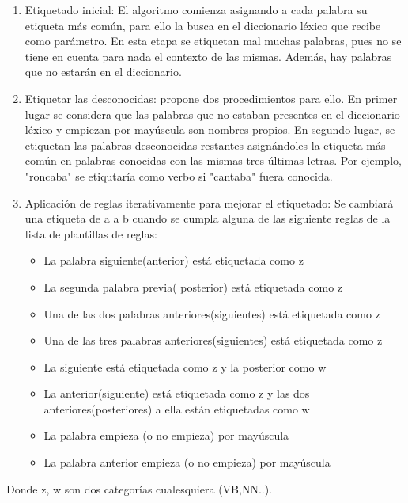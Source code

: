 \begin{enumerate}
\item Etiquetado inicial: El algoritmo comienza asignando a cada palabra su etiqueta más común, para ello la busca en el diccionario léxico que recibe como parámetro. En esta etapa se etiquetan mal muchas palabras, pues no se tiene en cuenta para nada el contexto de las mismas. Además, hay palabras que no estarán en el diccionario.
\item Etiquetar las desconocidas: \citet{padro2012freeling} propone dos procedimientos para ello. En primer lugar se considera que las palabras que no estaban presentes en el diccionario léxico y empiezan por mayúscula son nombres propios. En segundo lugar, se etiquetan las palabras desconocidas restantes asignándoles la etiqueta más común en palabras conocidas con las mismas tres últimas letras. Por ejemplo, \textsf{"roncaba"} se etiqutaría como verbo si \textsf{"cantaba"} fuera conocida.

\item Aplicación de reglas iterativamente para mejorar el etiquetado: Se cambiará una etiqueta de \textcolor{SchoolColor}{a} a \textcolor{SchoolColor}{b} cuando se cumpla alguna de las siguiente reglas de la lista de plantillas de reglas:
\begin{itemize}
\item La palabra siguiente(anterior) está etiquetada como \textcolor{SchoolColor}{z}
\item La segunda palabra previa( posterior) está etiquetada como \textcolor{SchoolColor}{z}
\item Una de las dos palabras anteriores(siguientes) está etiquetada como \textcolor{SchoolColor}{z}
\item Una de las tres palabras anteriores(siguientes) está etiquetada como \textcolor{SchoolColor}{z}
\item La siguiente está etiquetada como \textcolor{SchoolColor}{z} y la posterior como \textcolor{SchoolColor}{w}
\item La anterior(siguiente) está etiquetada como \textcolor{SchoolColor}{z} y las dos anteriores(posteriores) a ella están etiquetadas como \textcolor{SchoolColor}{w}
\item La palabra empieza (o no empieza) por mayúscula
\item La palabra anterior empieza (o no empieza) por mayúscula
\end{itemize} 
\end{enumerate}
Donde \textcolor{SchoolColor}{z}, \textcolor{SchoolColor}{w} son dos categorías cualesquiera (VB,NN..).
